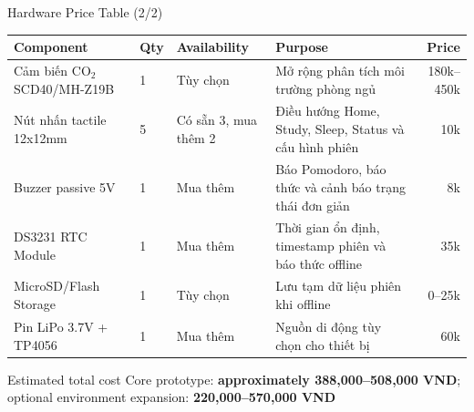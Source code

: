 ﻿\documentclass[aspectratio=169]{beamer}
\begin{document}
\begin{frame}{Hardware Price Table (2/2)}
  \scriptsize
  \begin{tabularx}{\textwidth}{@{}p{3.15cm}p{0.85cm}p{2.3cm}Lr@{}}
    \toprule
    \textbf{Component} & \textbf{Qty} & \textbf{Availability} & \textbf{Purpose} & \textbf{Price} \\
    \midrule
    Cảm biến CO$_2$ SCD40/MH-Z19B & 1 & Tùy chọn & Mở rộng phân tích môi trường phòng ngủ & 180k--450k \\
    Nút nhấn tactile 12x12mm & 5 & Có sẵn 3, mua thêm 2 & Điều hướng Home, Study, Sleep, Status và cấu hình phiên & 10k \\
    Buzzer passive 5V & 1 & Mua thêm & Báo Pomodoro, báo thức và cảnh báo trạng thái đơn giản & 8k \\
    DS3231 RTC Module & 1 & Mua thêm & Thời gian ổn định, timestamp phiên và báo thức offline & 35k \\
    MicroSD/Flash Storage & 1 & Tùy chọn & Lưu tạm dữ liệu phiên khi offline & 0--25k \\
    Pin LiPo 3.7V + TP4056 & 1 & Mua thêm & Nguồn di động tùy chọn cho thiết bị & 60k \\
    \bottomrule
  \end{tabularx}
  \vspace{0.25cm}
  \begin{block}{Estimated total cost}
    Core prototype: \textbf{approximately 388,000--508,000 VND}; optional environment expansion: \textbf{220,000--570,000 VND}
  \end{block}
\end{frame}
\end{document}
